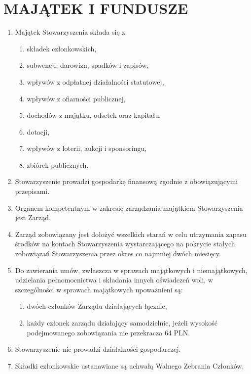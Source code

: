 \documentclass{article}
\begin{document}
\section{MAJĄTEK I FUNDUSZE}
  \begin{enumerate}
    \item Majątek Stowarzyszenia składa się z:
      \begin{enumerate}
        \item składek członkowskich,
        \item subwencji, darowizn, spadków i zapisów,
        \item wpływów z odpłatnej działalności statutowej,
        \item wpływów z ofiarności publicznej,
        \item dochodów z majątku, odsetek oraz kapitału,
        \item dotacji,
        \item wpływów z loterii, aukcji i sponsoringu,
        \item zbiórek publicznych.
      \end{enumerate}
    \item Stowarzyszenie prowadzi gospodarkę finansową zgodnie z obowiązującymi przepisami.
    \item Organem kompetentnym w zakresie zarządzania majątkiem Stowarzyszenia jest Zarząd.
    \item Zarząd zobowiązany jest dołożyć wszelkich starań w celu utrzymania zapasu środków na kontach Stowarzyszenia wystarczającego na pokrycie stałych zobowiązań Stowarzyszenia przez okres co najmniej dwóch miesięcy.
    \item Do zawierania umów, zwłaszcza w sprawach majątkowych i niemajątkowych, udzielania pełnomocnictwa i składania innych oświadczeń woli, w szczególności w sprawach majątkowych upoważnieni są:
      \begin{enumerate}
        \item dwóch członków Zarządu działających łącznie,
        \item każdy członek zarządu działający samodzielnie, jeżeli wysokość podejmowanego zobowiązania nie przekracza 64 PLN.
      \end{enumerate}
    \item Stowarzyszenie nie prowadzi działalności gospodarczej.
    \item Składki członkowskie ustanawiane są uchwałą Walnego Zebrania Członków.
  \end{enumerate}
\end{document}
